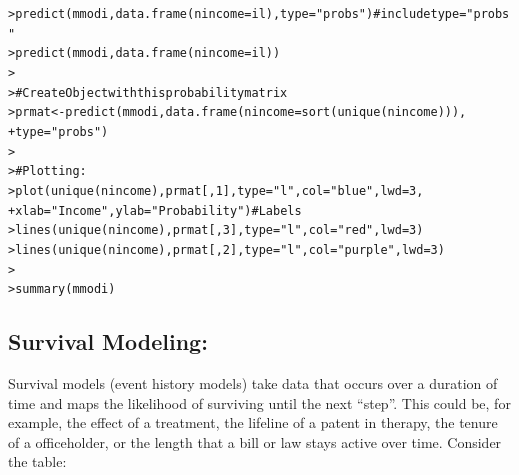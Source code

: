 \documentclass[12pt]{article}\usepackage[]{graphicx}\usepackage[]{color}
\makeatletter
\newcommand{\hlnum}[1]{\textcolor[rgb]{0.82,0.78,0.62}{#1}}%
\newcommand{\hlstr}[1]{\textcolor[rgb]{0.82,0.78,0.62}{#1}}%
\newcommand{\hlcom}[1]{\textcolor[rgb]{0.404,0.408,0.42}{#1}}%
\newcommand{\hlstd}[1]{\textcolor[rgb]{0.882,0.878,0.898}{#1}}%
\newcommand{\hlkwb}[1]{\textcolor[rgb]{0.902,0.675,0.196}{#1}}%
\newcommand{\hlkwc}[1]{\textcolor[rgb]{0.812,0.522,0.388}{#1}}%
\newcommand{\hlkwd}[1]{\textcolor[rgb]{0.733,0.388,0.812}{#1}}%
\newenvironment{kframe}{%
 \def\at@end@of@kframe{}%
 \ifinner\ifhmode%
  \def\at@end@of@kframe{\end{minipage}}%
  \begin{minipage}{\columnwidth}%
 \fi\fi%
 \def\FrameCommand##1{\hskip\@totalleftmargin \hskip-\fboxsep
 \colorbox{shadecolor}{##1}\hskip-\fboxsep
     \hskip-\linewidth \hskip-\@totalleftmargin \hskip\columnwidth}%
 \MakeFramed {\advance\hsize-\width
   \@totalleftmargin\z@ \linewidth\hsize
   \@setminipage}}%
 {\par\unskip\endMakeFramed%
 \at@end@of@kframe}
\newenvironment{knitrout}{}{} %
\makeatother
\begin{document}
\begin{flushleft}
\begin{knitrout}
\color{fgcolor}\begin{kframe}
\begin{alltt}
\hlstd{> }\hlkwd{predict}\hlstd{(mmodi,}\hlkwd{data.frame}\hlstd{(}\hlkwc{nincome}\hlstd{=il),}\hlkwc{type}\hlstd{=}\hlstr{"probs"}\hlstd{)} \hlcom{# include type="probs"}
\hlstd{> }\hlkwd{predict}\hlstd{(mmodi,}\hlkwd{data.frame}\hlstd{(}\hlkwc{nincome}\hlstd{=il))}
\hlstd{> }
\hlstd{> }\hlcom{# Create Object with this probability matrix}
\hlstd{> }\hlstd{prmat} \hlkwb{<-} \hlkwd{predict}\hlstd{(mmodi,}\hlkwd{data.frame}\hlstd{(}\hlkwc{nincome}\hlstd{=}\hlkwd{sort}\hlstd{(}\hlkwd{unique}\hlstd{(nincome))),}
\hlstd{+ }         \hlkwc{type}\hlstd{=}\hlstr{"probs"}\hlstd{)}
\hlstd{> }
\hlstd{> }\hlcom{# Plotting:}
\hlstd{> }\hlkwd{plot}\hlstd{(}\hlkwd{unique}\hlstd{(nincome), prmat[,}\hlnum{1}\hlstd{],} \hlkwc{type}\hlstd{=}\hlstr{"l"}\hlstd{,} \hlkwc{col}\hlstd{=}\hlstr{"blue"}\hlstd{,} \hlkwc{lwd}\hlstd{=}\hlnum{3}\hlstd{,}
\hlstd{+ }       \hlkwc{xlab}\hlstd{=}\hlstr{"Income"}\hlstd{,} \hlkwc{ylab}\hlstd{=}\hlstr{"Probability"}\hlstd{)} \hlcom{# Labels}
\hlstd{> }\hlkwd{lines}\hlstd{(}\hlkwd{unique}\hlstd{(nincome), prmat[,}\hlnum{3}\hlstd{],} \hlkwc{type}\hlstd{=}\hlstr{"l"}\hlstd{,} \hlkwc{col}\hlstd{=}\hlstr{"red"}\hlstd{,} \hlkwc{lwd}\hlstd{=}\hlnum{3}\hlstd{)}
\hlstd{> }\hlkwd{lines}\hlstd{(}\hlkwd{unique}\hlstd{(nincome), prmat[,}\hlnum{2}\hlstd{],} \hlkwc{type}\hlstd{=}\hlstr{"l"}\hlstd{,} \hlkwc{col}\hlstd{=}\hlstr{"purple"}\hlstd{,} \hlkwc{lwd}\hlstd{=}\hlnum{3}\hlstd{)}
\hlstd{> }
\hlstd{> }\hlkwd{summary}\hlstd{(mmodi)}
\end{alltt}
\end{kframe}
\end{knitrout}















\clearpage
\subsection{Survival Modeling:}

Survival models (event history models) take data that occurs over a duration of time and maps the likelihood of surviving until the next ``step''. This could be, for example, the effect of a treatment, the lifeline of a patent in therapy, the tenure of a officeholder, or the length that a bill or law stays active over time. Consider the table:


\end{flushleft}
\end{document}
